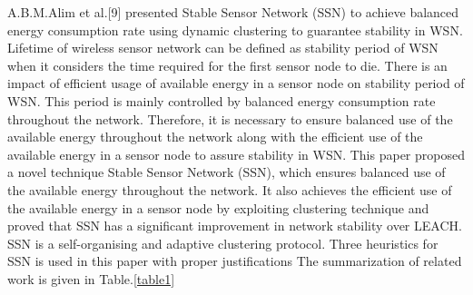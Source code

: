 \documentclass[MTech]{iitmdiss}
\begin{document}
A.B.M.Alim et al.[9]  presented   Stable Sensor Network (SSN) to achieve balanced energy consumption 
rate using dynamic clustering to guarantee stability in WSN. Lifetime of wireless sensor network  can be defined  as stability period of WSN when it considers the time required for the first sensor node to die. There is an impact of efficient usage of available energy in a sensor  node on stability period of WSN. This period is mainly controlled by balanced energy consumption rate throughout the network. Therefore, it is necessary  to ensure balanced use of the available energy throughout the network along  with the efficient use of the available energy in a sensor node to assure stability in WSN. This paper proposed a novel technique Stable Sensor Network (SSN), which ensures balanced use of the available energy  throughout the network. It also achieves the efficient use  of the available energy in a sensor node by exploiting  clustering technique and   proved that SSN has a significant  improvement in network stability over LEACH. SSN is a self-organising and adaptive clustering protocol. Three heuristics for SSN is used in this paper with proper justifications
The summarization of related work is given in Table.\ref{table1}
\\
\end{document}
